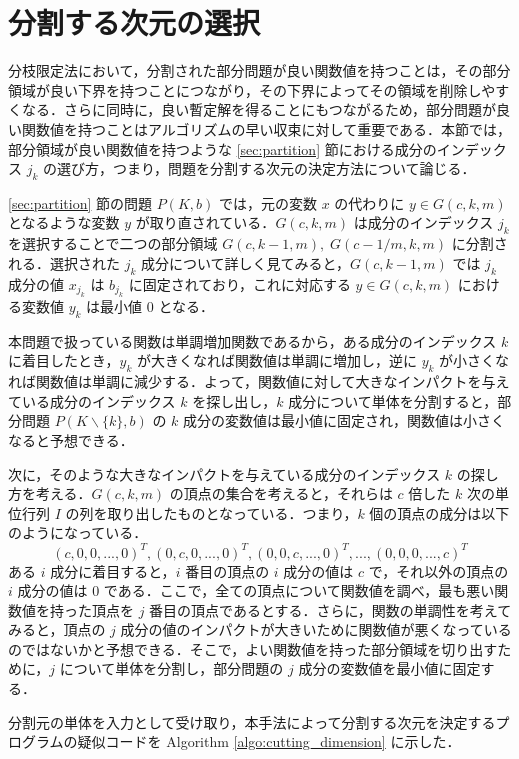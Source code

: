 \documentclass[a4paper,11pt]{jreport}
\begin{document}
\section{分割する次元の選択}

分枝限定法において，分割された部分問題が良い関数値を持つことは，その部分領域が良い下界を持つことにつながり，その下界によってその領域を削除しやすくなる．さらに同時に，良い暫定解を得ることにもつながるため，部分問題が良い関数値を持つことはアルゴリズムの早い収束に対して重要である．本節では，部分領域が良い関数値を持つような \ref{sec:partition} 節における成分のインデックス $ j_k $ の選び方，つまり，問題を分割する次元の決定方法について論じる．\par
\ref{sec:partition} 節の問題 $ P(K, b) $ では，元の変数 $ x $ の代わりに $ y \in G(c, k, m) $ となるような変数 $ y $ が取り直されている．$ G(c, k, m) $ は成分のインデックス $ j_k $ を選択することで二つの部分領域 $ G(c, k-1, m), \; G(c-1/m, k, m) $ に分割される．選択された $ j_k $ 成分について詳しく見てみると，$ G(c, k - 1, m) $ では $ j_k $ 成分の値 $ x_{j_k} $ は $ b_{j_k} $ に固定されており，これに対応する $ y \in G(c, k, m) $ における変数値 $ y_k $ は最小値 $ 0 $ となる．\par
本問題で扱っている関数は単調増加関数であるから，ある成分のインデックス $ k $ に着目したとき，$ y_k $ が大きくなれば関数値は単調に増加し，逆に $ y_k $ が小さくなれば関数値は単調に減少する．よって，関数値に対して大きなインパクトを与えている成分のインデックス $ k $ を探し出し，$ k $ 成分について単体を分割すると，部分問題 $ P(K \backslash \{ k \}, b) $ の $ k $ 成分の変数値は最小値に固定され，関数値は小さくなると予想できる．\par
次に，そのような大きなインパクトを与えている成分のインデックス $ k $ の探し方を考える．$ G(c, k, m) $ の頂点の集合を考えると，それらは $ c $ 倍した $ k $ 次の単位行列 $ I $ の列を取り出したものとなっている．つまり，$ k $ 個の頂点の成分は以下のようになっている．
$$ (c, 0, 0, ..., 0)^T, (0, c, 0, ..., 0)^T, (0, 0, c, ..., 0)^T, ..., (0, 0, 0, ..., c)^T $$
ある $ i $ 成分に着目すると，$ i $ 番目の頂点の $ i $ 成分の値は $ c $ で，それ以外の頂点の $ i $ 成分の値は $ 0 $ である．ここで，全ての頂点について関数値を調べ，最も悪い関数値を持った頂点を $ j $ 番目の頂点であるとする．さらに，関数の単調性を考えてみると，頂点の $ j $ 成分の値のインパクトが大きいために関数値が悪くなっているのではないかと予想できる．そこで，よい関数値を持った部分領域を切り出すために，$ j $ について単体を分割し，部分問題の $ j $ 成分の変数値を最小値に固定する．\par
分割元の単体を入力として受け取り，本手法によって分割する次元を決定するプログラムの疑似コードを Algorithm \ref{algo:cutting_dimension} に示した．\par
\end{document}
